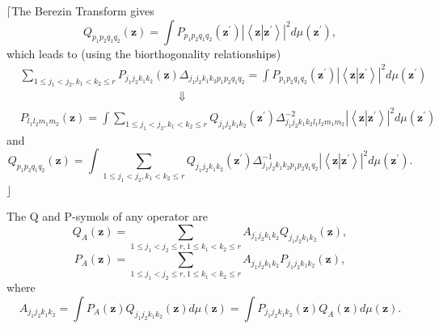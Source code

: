 \documentclass[aps,preprint]{revtex4}%
\begin{document}
$\lceil$The Berezin Transform gives
\begin{equation}
Q_{p_{1}p_{2}q_{1}q_{2}}\left(  \mathbf{z}\right)  =\int P_{p_{1}p_{2}%
q_{1}q_{2}}\left(  \mathbf{z}^{\prime}\right)  \left\vert \left\langle
\mathbf{z}\left\vert \mathbf{z}^{\prime}\right.  \right\rangle \right\vert
^{2}d\mu\left(  \mathbf{z}^{\prime}\right)  ,
\end{equation}
which leads to (using the biorthogonality relationships)
\begin{align}
&  \sum_{1\leq j_{1}<j_{2},k_{1}<k_{2}\leq r}P_{j_{1}j_{2}k_{1}k_{2}}\left(
\mathbf{z}\right)  \Delta_{j_{1}j_{2}k_{1}k_{2}p_{1}p_{2}q_{1}q_{2}}=\int
P_{p_{1}p_{2}q_{1}q_{2}}\left(  \mathbf{z}^{\prime}\right)  \left\vert
\left\langle \mathbf{z}\left\vert \mathbf{z}^{\prime}\right.  \right\rangle
\right\vert ^{2}d\mu\left(  \mathbf{z}^{\prime}\right) \nonumber\\
&  \qquad\qquad\qquad\qquad\qquad\qquad\qquad\left.  \Downarrow\right.
\nonumber\\
&  P_{l_{1}l_{2}m_{1}m_{2}}\left(  \mathbf{z}\right)  =\int\sum_{1\leq
j_{1}<j_{2},k_{1}<k_{2}\leq r}Q_{j_{1}j_{2}k_{1}k_{2}}\left(  \mathbf{z}%
^{\prime}\right)  \Delta_{j_{1}j_{2}k_{1}k_{2}l_{1}l_{2}m_{1}m_{2}}%
^{-2}\left\vert \left\langle \mathbf{z}\left\vert \mathbf{z}^{\prime}\right.
\right\rangle \right\vert ^{2}d\mu\left(  \mathbf{z}^{\prime}\right)
\end{align}
and
\begin{equation}
Q_{p_{1}p_{2}q_{1}q_{2}}\left(  \mathbf{z}\right)  =\int\sum_{1\leq
j_{1}<j_{2},k_{1}<k_{2}\leq r}Q_{j_{1}j_{2}k_{1}k_{2}}\left(  \mathbf{z}%
^{\prime}\right)  \Delta_{j_{1}j_{2}k_{1}k_{2}p_{1}p_{2}q_{1}q_{2}}%
^{-1}\left\vert \left\langle \mathbf{z}\left\vert \mathbf{z}^{\prime}\right.
\right\rangle \right\vert ^{2}d\mu\left(  \mathbf{z}^{\prime}\right)  .
\end{equation}
$\rfloor$

The Q and P-symols of any operator are
\begin{equation}
Q_{A}\left(  \mathbf{z}\right)  =\sum_{1\leq j_{1}<j_{2}\leq r,1\leq
k_{1}<k_{2}\leq r}A_{j_{1}j_{2}k_{1}k_{2}}Q_{j_{1}j_{2}k_{1}k_{2}}\left(
\mathbf{z}\right)  ,
\end{equation}%
\begin{equation}
P_{A}\left(  \mathbf{z}\right)  =\sum_{1\leq j_{1}<j_{2}\leq r,1\leq
k_{1}<k_{2}\leq r}A_{j_{1}j_{2}k_{1}k_{2}}P_{j_{1}j_{2}k_{1}k_{2}}\left(
\mathbf{z}\right)  ,
\end{equation}
where
\begin{equation}
A_{j_{1}j_{2}k_{1}k_{2}}=\int P_{A}\left(  \mathbf{z}\right)  Q_{j_{1}%
j_{2}k_{1}k_{2}}\left(  \mathbf{z}\right)  d\mu\left(  \mathbf{z}\right)
=\int P_{j_{1}j_{2}k_{1}k_{2}}\left(  \mathbf{z}\right)  Q_{A}\left(
\mathbf{z}\right)  d\mu\left(  \mathbf{z}\right)  .
\end{equation}
\end{document}
